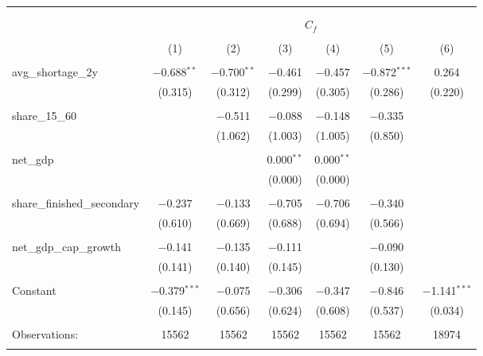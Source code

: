 
\begingroup 
\small 
\begin{tabular}{@{\extracolsep{5pt}}lcccccc} 
\\[-1.8ex]\hline 
\hline \\[-1.8ex] 
\\[-1.8ex] & \multicolumn{6}{c}{$C_{f}$} \\ 
\\[-1.8ex] & (1) & (2) & (3) & (4) & (5) & (6)\\ 
\hline \\[-1.8ex] 
 avg\_shortage\_2y & $-$0.688$^{**}$ & $-$0.700$^{**}$ & $-$0.461 & $-$0.457 & $-$0.872$^{***}$ & 0.264 \\ 
  & (0.315) & (0.312) & (0.299) & (0.305) & (0.286) & (0.220) \\ 
  & & & & & & \\ 
 share\_15\_60 &  & $-$0.511 & $-$0.088 & $-$0.148 & $-$0.335 &  \\ 
  &  & (1.062) & (1.003) & (1.005) & (0.850) &  \\ 
  & & & & & & \\ 
 net\_gdp &  &  & 0.000$^{**}$ & 0.000$^{**}$ &  &  \\ 
  &  &  & (0.000) & (0.000) &  &  \\ 
  & & & & & & \\ 
 share\_finished\_secondary & $-$0.237 & $-$0.133 & $-$0.705 & $-$0.706 & $-$0.340 &  \\ 
  & (0.610) & (0.669) & (0.688) & (0.694) & (0.566) &  \\ 
  & & & & & & \\ 
 net\_gdp\_cap\_growth & $-$0.141 & $-$0.135 & $-$0.111 &  & $-$0.090 &  \\ 
  & (0.141) & (0.140) & (0.145) &  & (0.130) &  \\ 
  & & & & & & \\ 
 Constant & $-$0.379$^{***}$ & $-$0.075 & $-$0.306 & $-$0.347 & $-$0.846 & $-$1.141$^{***}$ \\ 
  & (0.145) & (0.656) & (0.624) & (0.608) & (0.537) & (0.034) \\ 
  & & & & & & \\ 
Observations: & 15562 & 15562 & 15562 & 15562 & 15562 & 18974 \\ 
\hline \\[-1.8ex] 
\end{tabular} 
\endgroup 
